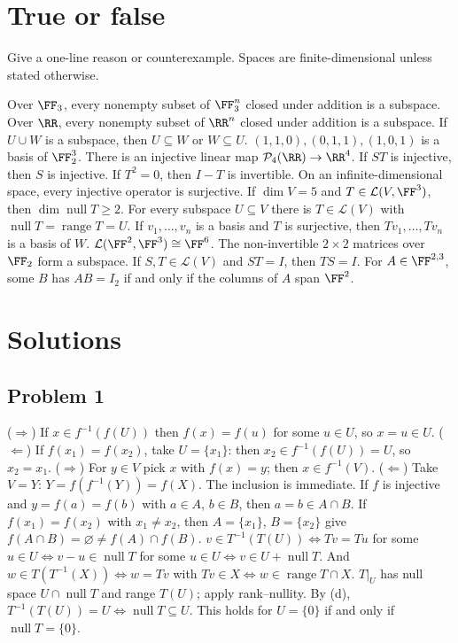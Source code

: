 \documentclass[11pt]{scrartcl}
\DeclareMathOperator{\nul}{null}
\DeclareMathOperator{\range}{range}
\newcommand{\LL}{\mathcal L}
\newcommand{\PP}{\mathcal P}
\begin{document}
\section{True or false}
Give a one-line reason or counterexample. Spaces are finite-dimensional unless stated otherwise.
\begin{enumerate}
  \ii Over $\FF_3$, every nonempty subset of $\FF_3^n$ closed under addition is a subspace.
  \ii Over $\RR$, every nonempty subset of $\RR^n$ closed under addition is a subspace.
  \ii If $U\cup W$ is a subspace, then $U\subseteq W$ or $W\subseteq U$.
  \ii $(1,1,0),(0,1,1),(1,0,1)$ is a basis of $\FF_2^3$.
  \ii There is an injective linear map $\PP_4(\RR)\to\RR^4$.
  \ii If $ST$ is injective, then $S$ is injective.
  \ii If $T^2=0$, then $I-T$ is invertible.
  \ii On an infinite-dimensional space, every injective operator is surjective.
  \ii If $\dim V=5$ and $T\in\LL(V,\FF^3)$, then $\dim\nul T\ge2$.
  \ii For every subspace $U\subseteq V$ there is $T\in\LL(V)$ with $\nul T=\range T=U$.
  \ii If $v_1,\dots,v_n$ is a basis and $T$ is surjective, then $Tv_1,\dots,Tv_n$ is a basis of $W$.
  \ii $\LL(\FF^2,\FF^3)\cong\FF^6$.
  \ii The non-invertible $2\times2$ matrices over $\FF_2$ form a subspace.
  \ii If $S,T\in\LL(V)$ and $ST=I$, then $TS=I$.
  \ii For $A\in\FF^{2,3}$, some $B$ has $AB=I_2$ if and only if the columns of $A$ span $\FF^2$.
\end{enumerate}

\newpage
\section{Solutions}\label{sec:sol}

\subsection*{Problem 1}
\begin{enumerate}[(a)]
  \ii ($\Rightarrow$) If $x\in f^{-1}(f(U))$ then $f(x)=f(u)$ for some $u\in U$, so $x=u\in U$.
  ($\Leftarrow$) If $f(x_1)=f(x_2)$, take $U=\{x_1\}$: then $x_2\in f^{-1}(f(U))=U$, so $x_2=x_1$.
  \ii ($\Rightarrow$) For $y\in V$ pick $x$ with $f(x)=y$; then $x\in f^{-1}(V)$.
  ($\Leftarrow$) Take $V=Y$: $Y=f(f^{-1}(Y))=f(X)$.
  \ii The inclusion is immediate.
  If $f$ is injective and $y=f(a)=f(b)$ with $a\in A$, $b\in B$, then $a=b\in A\cap B$.
  If $f(x_1)=f(x_2)$ with $x_1\ne x_2$, then $A=\{x_1\}$, $B=\{x_2\}$ give $f(A\cap B)=\varnothing\ne f(A)\cap f(B)$.
  \ii $v\in T^{-1}(T(U))\iff Tv=Tu$ for some $u\in U\iff v-u\in\nul T$ for some $u\in U\iff v\in U+\nul T$.
  And $w\in T(T^{-1}(X))\iff w=Tv$ with $Tv\in X\iff w\in\range T\cap X$.
  \ii $T|_U$ has null space $U\cap\nul T$ and range $T(U)$; apply rank--nullity.
  By (d), $T^{-1}(T(U))=U\iff\nul T\subseteq U$.
  This holds for $U=\{0\}$ if and only if $\nul T=\{0\}$.
\end{enumerate}
\end{document}
